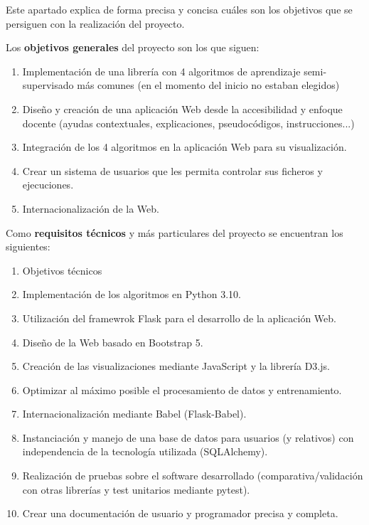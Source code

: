 
Este apartado explica de forma precisa y concisa cuáles son los objetivos que se
persiguen con la realización del proyecto.


Los \textbf{objetivos generales} del proyecto son los que siguen:
\begin{enumerate}
    \item Implementación de una librería con 4 algoritmos de aprendizaje semi-supervisado más comunes (en el momento del inicio no estaban elegidos)
    \item Diseño y creación de una aplicación Web desde la accesibilidad y enfoque docente (ayudas contextuales, explicaciones, pseudocódigos, instrucciones...)
    \item Integración de los 4 algoritmos en la aplicación Web para su visualización.
    \item Crear un sistema de usuarios que les permita controlar sus ficheros y ejecuciones.
    \item Internacionalización de la Web.
\end{enumerate}

Como \textbf{requisitos técnicos} y más particulares del proyecto se encuentran los
siguientes:

\begin{enumerate}
    \item Objetivos técnicos
    \item Implementación de los algoritmos en Python 3.10.
    \item Utilización del framewrok Flask para el desarrollo de la aplicación Web.
    \item Diseño de la Web basado en Bootstrap 5.
    \item Creación de las visualizaciones mediante JavaScript y la librería D3.js.
    \item Optimizar al máximo posible el procesamiento de datos y entrenamiento.
    \item Internacionalización mediante Babel (Flask-Babel).
    \item Instanciación y manejo de una base de datos para usuarios (y relativos) con independencia de la tecnología utilizada (SQLAlchemy).
    \item Realización de pruebas sobre el software desarrollado (comparativa/validación con otras librerías y
    test unitarios mediante pytest).
    \item Crear una documentación de usuario y programador precisa y completa.
\end{enumerate}